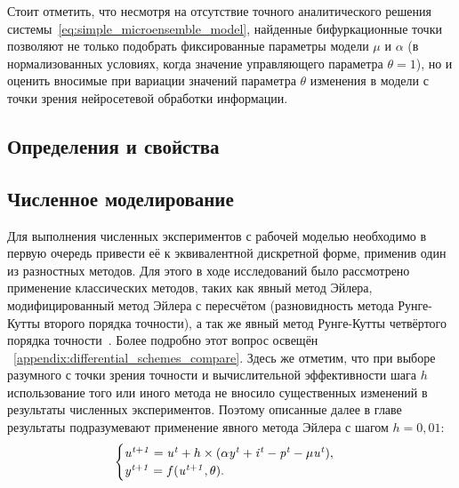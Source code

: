 Стоит отметить, что несмотря на отсутствие точного аналитического решения системы~\eqref{eq:simple_microensemble_model}, найденные бифуркационные точки позволяют не только подобрать фиксированные параметры модели $\mu$ и $\alpha$ (в нормализованных условиях, когда значение управляющего параметра $\theta = 1$), но и оценить вносимые при вариации значений параметра $\theta$ изменения в модели с точки зрения нейросетевой обработки информации.

\subsection{Определения и свойства}

\subsection{Численное моделирование}

Для выполнения численных экспериментов с рабочей моделью необходимо в первую очередь привести её к эквивалентной дискретной форме, применив один из разностных методов. Для этого в ходе исследований было рассмотрено применение классических методов, таких как явный метод Эйлера, модифицированный метод Эйлера с пересчётом (разновидность метода Рунге-Кутты второго порядка точности), а так же явный метод Рунге-Кутты четвёртого порядка точности~\cite{Hairer1990}. Более подробно этот вопрос освещён \inappendix~\ref{appendix:differential_schemes_compare}. Здесь же отметим, что при выборе разумного с точки зрения точности и вычислительной эффективности шага $h$ использование того или иного метода не вносило существенных изменений в результаты численных экспериментов. Поэтому описанные далее в главе результаты подразумевают применение явного метода Эйлера с шагом $h = 0,01$:
\begin{equation*}
    \begin{cases}
        \mathit{u^{t+1}} = \mathit{u^{t}} + h \times ( \alpha\mathit{y^{t}} + \mathit{i^{t}} - \mathit{p^{t}} - \mu\mathit{u^{t}} ), \\ 
        \mathit{y^{t+1}} = f(\mathit{u^{t+1}}, \theta).
    \end{cases}
\end{equation*}


